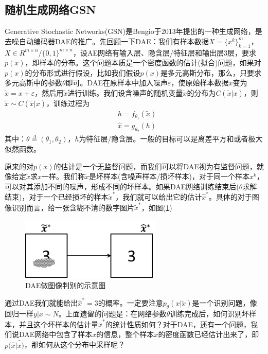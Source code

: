     \subsection{随机生成网络GSN}
        \par
        Generative Stochastic Networks(GSN)是Bengio于2013年提出的一种生成网络，是去噪自动编码器DAE的推广。先回顾一下DAE：我们有样本数据$X=\{x^k\}_{k=1}^m$，$X\in R^{m\times n}/\{0,1\}^{m\times n}$，设AE网络有输入层、隐含层/特征层和输出层3层，要求$p(x)$，即样本的分布。这个问题本质是一个密度函数的估计(拟合)问题，如果对$p(x)$的分布形式进行假设，比如我们假设$p(x)$是多元高斯分布，那么，只要求多元高斯中的参数$\theta$即可。DAE在原样本中加入噪声$\varepsilon$，使原始样本数据$x$变为$\tilde{x} = x+\varepsilon$，然后用$\tilde{x}$进行训练。我们设含噪声的随机变量$\tilde{x}$的分布为$C(\tilde{x}|x)$，则$\tilde{x}\sim C(\tilde{x}|x)$，训练过程为
        \begin{align*}
        & h=f_{\theta_1}(\tilde{x})\\
        & \hat{x}= g_{\theta_2}(h)
        \end{align*}
        其中：$\theta \overset{\Delta}{= } (\theta_1,\theta_2)$，$h$为特征层/隐含层。一般的目标可以是离差平方和或者极大似然函数。
        \par
        原来的对$p(x)$的估计是一个无监督问题，而我们可以将DAE视为有监督问题，就像给定$\tilde{x}$求$x$一样。我们称$\tilde{x}$是坏样本(含噪声样本/损坏样本)，对于同一个样本$x^k$，可以对其添加不同的噪声，形成不同的坏样本。如果DAE网络训练结束后($\theta$求解结束)，对于一个已经损坏的样本$\tilde{x}^*$，我们就可以给出它的估计$\hat{x}^*$。具体的对于图像识别而言，给一张含糊不清的数字图片$\tilde{x}^*$，如图(\ref{fig:DAE做图像判别的示意图})
            \begin{figure}[H]
            \centering
            \includegraphics[height=3cm]{images/DAE_for_Image_discrimination.jpg}
            \caption{DAE做图像判别的示意图}
            \label{fig:DAE做图像判别的示意图}
            \end{figure}
        通过DAE我们就能给出$\hat{x}^* = 3$的概率。一定要注意$p_\theta(x|\tilde{x})$是一个识别问题，像回归一样$y|x\sim N$。上面遗留的问题是：在网络参数$\theta$训练完成后，如何识别坏样本，并且这个坏样本的估计量$\hat{x}^*$的统计性质如何？对于DAE，还有一个问题，我们说DAE网络中包含了样本$x$的信息，整个样本$x$的密度函数已经估计出来了，即$p(\hat{x}|\tilde{x)}$，那如何从这个分布中采样呢？
